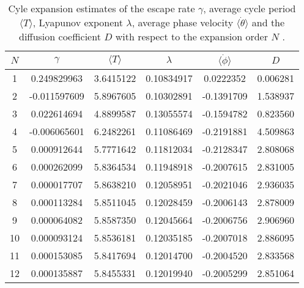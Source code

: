 \begin{table}
    \begin{tabular}{c|c|c|c|c|c}
     $N$ & $\gamma$ & $\langle T \rangle$ & $\lambda$ & $\langle \dot{\phi} \rangle$ & $D$ \\ 
    \hline
    1 & 0.249829963 & 3.6415122 & 0.10834917 & 0.0222352 & 0.006281 \\ 
    2 & -0.011597609 & 5.8967605 & 0.10302891 & -0.1391709 & 1.538937 \\ 
    3 & 0.022614694 & 4.8899587 & 0.13055574 & -0.1594782 & 0.823560 \\ 
    4 & -0.006065601 & 6.2482261 & 0.11086469 & -0.2191881 & 4.509863 \\ 
    5 & 0.000912644 & 5.7771642 & 0.11812034 & -0.2128347 & 2.808068 \\ 
    6 & 0.000262099 & 5.8364534 & 0.11948918 & -0.2007615 & 2.831005 \\ 
    7 & 0.000017707 & 5.8638210 & 0.12058951 & -0.2021046 & 2.936035 \\ 
    8 & 0.000113284 & 5.8511045 & 0.12028459 & -0.2006143 & 2.878009 \\ 
    9 & 0.000064082 & 5.8587350 & 0.12045664 & -0.2006756 & 2.906960 \\ 
    10 & 0.000093124 & 5.8536181 & 0.12035185 & -0.2007018 & 2.886095 \\ 
    11 & 0.000153085 & 5.8417694 & 0.12014700 & -0.2004520 & 2.833568 \\ 
    12 & 0.000135887 & 5.8455331 & 0.12019940 & -0.2005299 & 2.851064 \\ 
    \end{tabular}
    \caption{Cyle expansion estimates of the escape rate $\gamma$, average 
    cycle period $\langle T \rangle$, Lyapunov exponent $\lambda$, average 
    phase velocity $\langle \dot{\theta} \rangle$ and the diffusion coefficient 
    $D$ with respect to the expansion order $N$ .}
    \label{t-DynamicalAveragesNoGrammar}
\end{table}
